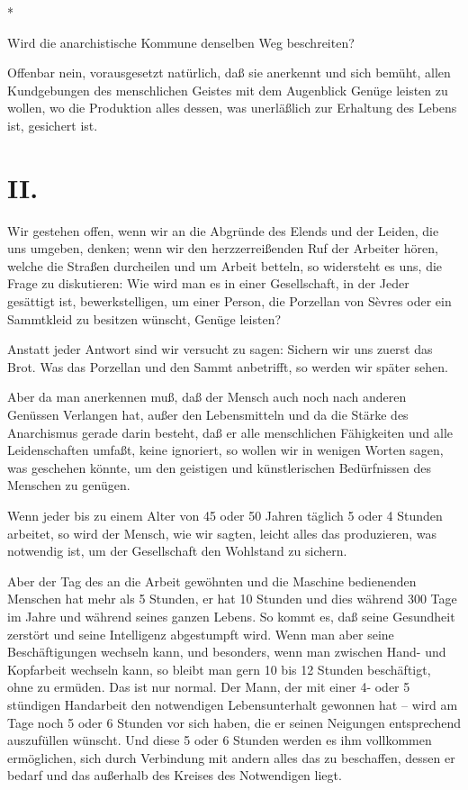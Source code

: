 \documentclass{scrbook}
\begin{document}
\begin{center}*\end{center}

Wird die anarchistische Kommune denselben Weg beschreiten?

Offenbar nein, vorausgesetzt natürlich, daß sie anerkennt und sich bemüht, allen Kundgebungen des menschlichen Geistes mit dem Augenblick Genüge leisten zu wollen, wo die Produktion alles dessen, was unerläßlich zur Erhaltung des Lebens ist, gesichert ist.

\section*{II.}

Wir gestehen offen, wenn wir an die Abgründe des Elends und der Leiden, die uns umgeben, denken; wenn wir den herzzerreißenden Ruf der Arbeiter hören, welche die Straßen durcheilen und um Arbeit betteln, so widersteht es uns, die Frage zu diskutieren: Wie wird man es in einer Gesellschaft, in der Jeder gesättigt ist, bewerkstelligen, um einer Person, die Porzellan von Sèvres oder ein Sammtkleid zu besitzen wünscht, Genüge leisten?

Anstatt jeder Antwort sind wir versucht zu sagen: Sichern wir uns zuerst das Brot. Was das Porzellan und den Sammt anbetrifft, so werden wir später sehen.

Aber da man anerkennen muß, daß der Mensch auch noch nach anderen Genüssen Verlangen hat, außer den Lebensmitteln und da die Stärke des Anarchismus gerade darin besteht, daß er alle menschlichen Fähigkeiten und alle Leidenschaften umfaßt, keine ignoriert, so wollen wir in wenigen Worten sagen, was geschehen könnte, um den geistigen und künstlerischen Bedürfnissen des Menschen zu genügen.

Wenn jeder bis zu einem Alter von 45 oder 50 Jahren täglich 5 oder 4 Stunden arbeitet, so wird der Mensch, wie wir sagten, leicht alles das produzieren, was notwendig ist, um der Gesellschaft den Wohlstand zu sichern.

Aber der Tag des an die Arbeit gewöhnten und die Maschine bedienenden Menschen hat mehr als 5 Stunden, er hat 10 Stunden und dies während 300 Tage im Jahre und während seines ganzen Lebens. So kommt es, daß seine Gesundheit zerstört und seine Intelligenz abgestumpft wird. Wenn man aber seine Beschäftigungen wechseln kann, und besonders, wenn man zwischen Hand- und Kopfarbeit wechseln kann, so bleibt man gern 10 bis 12 Stunden beschäftigt, ohne zu ermüden. Das ist nur normal. Der Mann, der mit einer 4- oder 5 stündigen Handarbeit den notwendigen Lebensunterhalt gewonnen hat – wird am Tage noch 5 oder 6 Stunden vor sich haben, die er seinen Neigungen entsprechend auszufüllen wünscht. Und diese 5 oder 6 Stunden werden es ihm vollkommen ermöglichen, sich durch Verbindung mit andern alles das zu beschaffen, dessen er bedarf und das außerhalb des Kreises des Notwendigen liegt.
\end{document}
